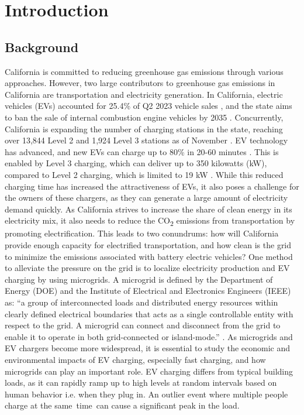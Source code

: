 \documentclass[conference]{IEEEtran}
\begin{document}
\section{Introduction}
    \subsection{Background}
		California is committed to reducing greenhouse gas emissions through various approaches. However, two large contributors to greenhouse gas emissions in California are transportation and electricity generation.  In California, electric vehicles (EVs) accounted for 25.4\% of Q2 2023 vehicle sales \cite{ev_sale_percentage}, and the state aims to ban the sale of internal combustion engine vehicles by 2035 \cite{ice_ban}. Concurrently, California is expanding the number of charging stations in the state, reaching over 13,844 Level 2 and 1,924 Level 3 stations \cite{ev_stations_CA} as of November . EV technology has advanced, and new EVs can charge up to 80\% in 20-60 minutes \cite{ev_stats}. This is enabled by Level 3 charging, which can deliver up to 350 kilowatts (kW), compared to Level 2 charging, which is limited to 19 kW \cite{ev_stats}. While this reduced charging time has increased the attractiveness of EVs, it also poses a challenge for the owners of these chargers, as they can generate a large amount of electricity demand quickly. As California strives to increase the share of clean energy in its electricity mix, it also needs to reduce the CO\textsubscript{2} emissions from transportation by promoting electrification. This leads to two conundrums: how will California provide enough capacity for electrified transportation, and how clean is the grid to minimize the emissions associated with battery electric vehicles? One method to alleviate the pressure on the grid is to localize electricity production and EV charging by using microgrids. A microgrid is defined by the Department of Energy (DOE) and the Institute of Electrical and Electronics Engineers (IEEE) as: “a group of interconnected loads and distributed energy resources within clearly defined electrical boundaries that acts as a single controllable entity with respect to the grid. A microgrid can connect and disconnect from the grid to enable it to operate in both grid-connected or island-mode.” \cite{microgrid_def} \cite{microgrid_def_ieee}. As microgrids and EV chargers become more widespread, it is essential to study the economic and environmental impacts of EV charging, especially fast charging, and how microgrids can play an important role. EV charging differs from typical building loads, as it can rapidly ramp up to high levels at random intervals based on human behavior i.e. when they plug in. An outlier event where multiple people charge at the same time can cause a significant peak in the load. 
		
\end{document}
